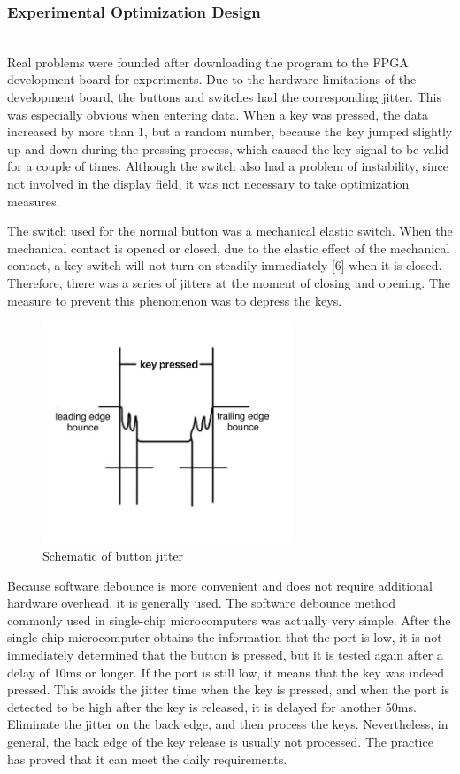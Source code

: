 \documentclass[11pt,journal,compsoc]{IEEEtran}
\begin{document}
\subsubsection{Experimental Optimization Design}
\hfill\\
Real problems were founded after downloading the program to the FPGA development board for experiments. Due to the hardware limitations of the development board, the buttons and switches had the corresponding jitter. This was especially obvious when entering data. When a key was pressed, the data increased by more than 1, but a random number, because the key jumped slightly up and down during the pressing process, which caused the key signal to be valid for a couple of times. Although the switch also had a problem of instability, since not involved in the display field, it was not necessary to take optimization measures. 

The switch used for the normal button was a mechanical elastic switch. When the mechanical contact is opened or closed, due to the elastic effect of the mechanical contact, a key switch will not turn on steadily immediately [6] when it is closed. Therefore, there was a series of jitters at the moment of closing and opening. The measure to prevent this phenomenon was to depress the keys.
\begin{figure}[H]
	\centering
	\includegraphics[width=7.5cm]{fig7}
	\caption{Schematic of button jitter}
	\label{Fig7}
\end{figure}
Because software debounce is more convenient and does not require additional hardware overhead, it is generally used. The software debounce method commonly used in single-chip microcomputers was actually very simple. After the single-chip microcomputer obtains the information that the port is low, it is not immediately determined that the button is pressed, but it is tested again after a delay of 10ms or longer. If the port is still low, it means that the key was indeed pressed. This avoids the jitter time when the key is pressed, and when the port is detected to be high after the key is released, it is delayed for another 50ms. Eliminate the jitter on the back edge, and then process the keys. Nevertheless, in general, the back edge of the key release is usually not processed. The practice has proved that it can meet the daily requirements.
\end{document}
